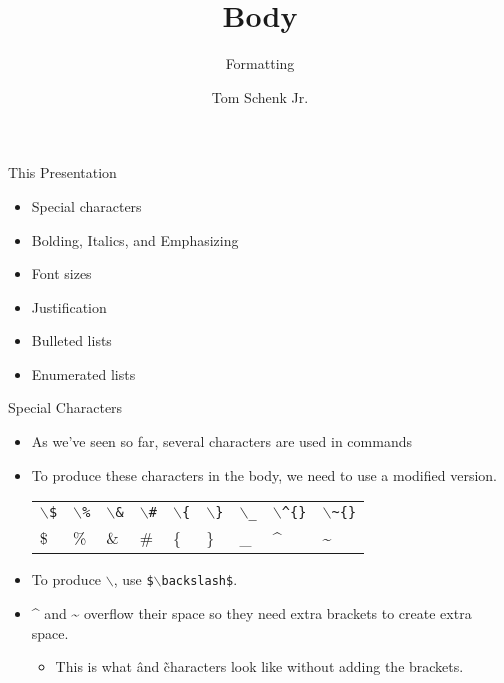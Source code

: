\documentclass[pdf]{prosper}
\title{Body}
\subtitle{Formatting}
\author{Tom Schenk Jr.}
\begin{document}
\maketitle
\begin{slide}{This Presentation}
	\begin{itemize}
		\item Special characters
		\item Bolding, Italics, and Emphasizing
		\item Font sizes
		\item Justification
		\item Bulleted lists
		\item Enumerated lists
	\end{itemize}
\end{slide}
\begin{slide}{Special Characters}
	\begin{itemize}
		\item As we've seen so far, several characters are used in commands
		\item To produce these characters in the body, we need to use a modified version. \\
			\begin{tabular}{l l l l l l l l l}
				\texttt{$\backslash$\$} & \texttt{$\backslash$\%} & \texttt{$\backslash$\&} & \texttt{$\backslash$\#} & \texttt{$\backslash$\{} & \texttt{$\backslash$\}} & \texttt{$\backslash$\_} & \texttt{$\backslash$\^{}\{\}} & \texttt{$\backslash$\~{}\{\}} \\
				\$ & \% & \& & \# & \{ & \} & \_ & \^{} & \~{} \\
			\end{tabular}
		\item To produce $\backslash$, use \texttt{\$$\backslash$backslash\$}.
		\item \^{} and \~{} overflow their space so they need extra brackets to create extra space.
			\begin{itemize}
				\item This is what \^ and \~ characters look like without adding the brackets.
			\end{itemize}
	\end{itemize}
\end{slide}
\end{document}
